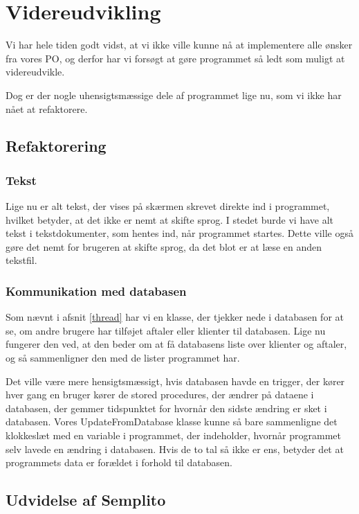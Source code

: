 \section{Videreudvikling}

Vi har hele tiden godt vidst, at vi ikke ville kunne nå at implementere alle ønsker fra vores PO, og derfor har vi forsøgt at gøre programmet så ledt som muligt at videreudvikle.

Dog er der nogle uhensigtsmæssige dele af programmet lige nu, som vi ikke har nået at refaktorere.

\subsection{Refaktorering}
\subsubsection{Tekst}
Lige nu er alt tekst, der vises på skærmen skrevet direkte ind i programmet, hvilket betyder, at det ikke er nemt at skifte sprog.
I stedet burde vi have alt tekst i tekstdokumenter, som hentes ind, når programmet startes.
Dette ville også gøre det nemt for brugeren at skifte sprog, da det blot er at læse en anden tekstfil.

\subsubsection{Kommunikation med databasen}
Som nævnt i afsnit \ref{thread} har vi en klasse, der tjekker nede i databasen for at se, om andre brugere har tilføjet aftaler eller klienter til databasen.
Lige nu fungerer den ved, at den beder om at få databasens liste over klienter og aftaler, og så sammenligner den med de lister programmet har.

Det ville være mere hensigtsmæssigt, hvis databasen havde en trigger, der kører hver gang en bruger kører de stored procedures, der ændrer på dataene i databasen, der gemmer tidspunktet for hvornår den sidste ændring er sket i databasen.
Vores UpdateFromDatabase klasse kunne så bare sammenligne det klokkeslæt med en variable i programmet, der indeholder, hvornår programmet selv lavede en ændring i databasen.
Hvis de to tal så ikke er ens, betyder det at programmets data er forældet i forhold til databasen.

\subsection{Udvidelse af Semplito}

